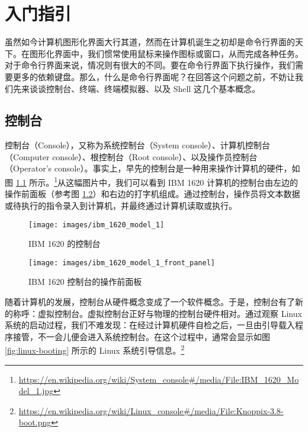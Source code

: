 \documentclass[]{ctexbook}
\begin{document}
\mainmatter

\hypertarget{ux5165ux95e8ux6307ux5f15}{%
\chapter{入门指引}\label{ux5165ux95e8ux6307ux5f15}}

虽然如今计算机图形化界面大行其道，然而在计算机诞生之初却是命令行界面的天下。在图形化界面中，我们惯常使用鼠标来操作图标或窗口，从而完成各种任务。对于命令行界面来说，情况则有很大的不同。要在命令行界面下执行操作，我们需要更多的依赖键盘。那么，什么是命令行界面呢？在回答这个问题之前，不妨让我们先来谈谈控制台、终端、终端模拟器、以及 Shell 这几个基本概念。

\hypertarget{ux63a7ux5236ux53f0}{%
\section{控制台}\label{ux63a7ux5236ux53f0}}

控制台（Console），又称为系统控制台（System console）、计算机控制台（Computer console）、根控制台（Root console）、以及操作员控制台（Operator's console）。事实上，早先的控制台是一种用来操作计算机的硬件，如图 \ref{fig:ibm-1620-model-1} 所示。\footnote{\url{https://en.wikipedia.org/wiki/System_console\#/media/File:IBM_1620_Model_1.jpg}}从这幅图片中，我们可以看到 IBM 1620 计算机的控制台由左边的操作前面板（参考图 \ref{fig:ibm-1620-model-1-front-panel}）和右边的打字机组成。通过控制台，操作员将文本数据或待执行的指令录入到计算机，并最终通过计算机读取或执行。

\begin{figure}
\texttt{[image: images/ibm\_1620\_model\_1]} \caption{IBM 1620 的控制台}\label{fig:ibm-1620-model-1}
\end{figure}

\begin{figure}
\texttt{[image: images/ibm\_1620\_model\_1\_front\_panel]} \caption{IBM 1620 控制台的操作前面板}\label{fig:ibm-1620-model-1-front-panel}
\end{figure}

随着计算机的发展，控制台从硬件概念变成了一个软件概念。于是，控制台有了新的称呼：虚拟控制台。虚拟控制台正好与物理的控制台硬件相对。通过观察 Linux 系统的启动过程，我们不难发现：在经过计算机硬件自检之后，一旦由引导载入程序接管，不一会儿便会进入系统控制台。在这个过程中，通常会显示如图 \ref{fig:linux-booting} 所示的 Linux 系统引导信息。\footnote{\url{https://en.wikipedia.org/wiki/Linux_console\#/media/File:Knoppix-3.8-boot.png}}
\end{document}
